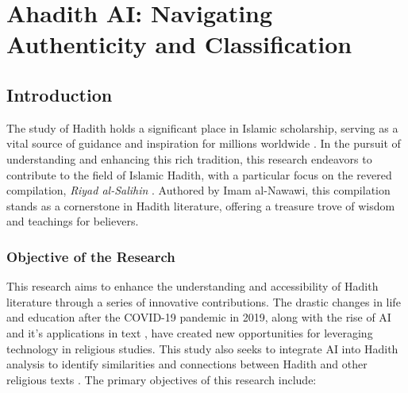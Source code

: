\chapter{Ahadith AI: Navigating Authenticity and Classification}
\label{chap:Ahadith_AI:_Navigating_Authenticity_and_Classification}



%
\section{Introduction}\label{sec:introduction}


The study of Hadith holds a significant place in Islamic scholarship, serving as a vital source of guidance and inspiration for millions worldwide \cite{what_hadith_is}. In the pursuit of understanding and enhancing this rich tradition, this research endeavors to contribute to the field of Islamic Hadith, with a particular focus on the revered compilation, \textit{Riyad al-Salihin} \cite{what_hadith_is}. Authored by Imam al-Nawawi, this compilation stands as a cornerstone in Hadith literature, offering a treasure trove of wisdom and teachings for believers.

\subsection{Objective of the Research}

This research aims to enhance the understanding and accessibility of Hadith literature through a series of innovative contributions. The drastic changes in life and education after the COVID-19 pandemic in 2019, along with the rise of AI \cite{Mazzara2022} and it's applications in text \cite{10062863}, have created new opportunities for leveraging technology in religious studies. This study also seeks to integrate AI into Hadith analysis to identify similarities and connections between Hadith and other religious texts \cite{Altammami2023}. The primary objectives of this research include:

